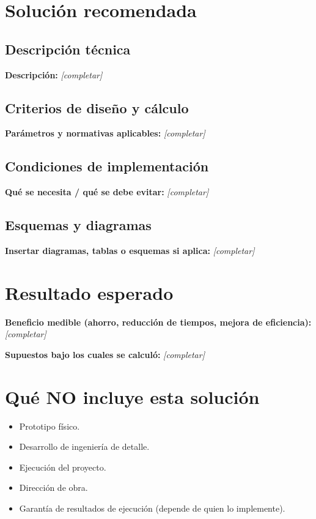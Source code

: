 \documentclass[11pt,a4paper]{article}
\newcommand{\campoVacio}[1]{\textbf{\textcolor{irdblack}{#1:}} \textcolor{irdblack}{\textit{[completar]}}\par\vspace{0.3em}}
\begin{document}
\section{Solución recomendada}

\subsection{Descripción técnica}
\campoVacio{Descripción}

\subsection{Criterios de diseño y cálculo}
\campoVacio{Parámetros y normativas aplicables}

\subsection{Condiciones de implementación}
\campoVacio{Qué se necesita / qué se debe evitar}

\subsection{Esquemas y diagramas}
\campoVacio{Insertar diagramas, tablas o esquemas si aplica}

\section{Resultado esperado}

\campoVacio{Beneficio medible (ahorro, reducción de tiempos, mejora de eficiencia)}
\campoVacio{Supuestos bajo los cuales se calculó}

\section{Qué NO incluye esta solución}

\begin{alertbox}
\begin{itemize}[leftmargin=1.2em, itemsep=2pt]
    \item Prototipo físico.
    \item Desarrollo de ingeniería de detalle.
    \item Ejecución del proyecto.
    \item Dirección de obra.
    \item Garantía de resultados de ejecución (depende de quien lo implemente).
\end{itemize}
\end{alertbox}
\end{document}
